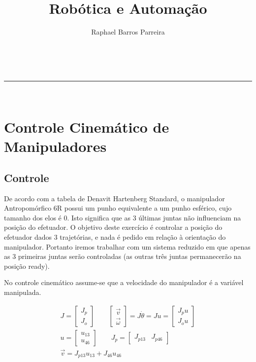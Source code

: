 \documentclass[a4paper,11pt]{article}
\makeatletter
\newcommand{\linia}{\rule{\linewidth}{0.5pt}}
\theoremstyle{mytheor}
\renewcommand{\maketitle}{
\begin{center}
\vspace{2ex}
{\huge \textsc{\@title}}
\vspace{1ex}
\\
\linia\\
\@author \hfill \@date
\vspace{4ex}
\end{center}
}
\makeatother
\begin{document}
\title{Robótica e Automação}

\author{Raphael Barros Parreira}

\date{}

\maketitle

\section{Controle Cinemático de Manipuladores} %

\subsection{Controle}

De acordo com a tabela de Denavit Hartenberg Standard, o manipulador Antropomórfico 6R possui um punho equivalente a um punho esférico, cujo tamanho dos elos é 0. Isto significa que as 3 últimas juntas não influenciam na posição do efetuador. O objetivo deste exercício é controlar a posição do efetuador dados 3 trajetórias, e nada é pedido em relação à orientação do manipulador. Portanto iremos trabalhar com um sistema reduzido em que apenas as 3 primeiras juntas serão controladas (as outras três juntas permanecerão na posição ready).

No controle cinemático assume-se que a velocidade do manipulador é a variável manipulada.

\begin{gather*}
J = \begin{bmatrix} J_p \\ J_o \end{bmatrix} \qquad
\begin{bmatrix} \vec{v} \\ \vec{\omega} \end{bmatrix} = J\dot{\theta} = Ju
= \begin{bmatrix}J_pu \\ J_ou\end{bmatrix} \\
u = \begin{bmatrix}u_{13} \\ u_{46}\end{bmatrix} \qquad
J_p = \begin{bmatrix}J_{p13} & J_{p46}\end{bmatrix} \\
\vec{v} = J_{p13}u_{13} + J_{46}u_{46}
\end{gather*}
\end{document}
